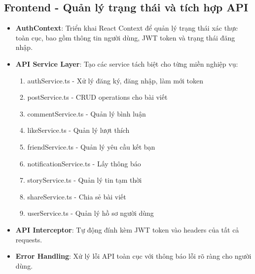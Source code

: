 \documentclass[a4paper]{article}
\begin{document}
    \subsection{Frontend - Quản lý trạng thái và tích hợp API}
    \begin{itemize}
        \item \textbf{AuthContext}: Triển khai React Context để quản lý trạng thái xác thực toàn cục, bao gồm thông tin người dùng, JWT token và trạng thái đăng nhập.
        \item \textbf{API Service Layer}: Tạo các service tách biệt cho từng miền nghiệp vụ:
        \begin{enumerate}
            \item authService.ts - Xử lý đăng ký, đăng nhập, làm mới token
            \item postService.ts - CRUD operations cho bài viết
            \item commentService.ts - Quản lý bình luận
            \item likeService.ts - Quản lý lượt thích
            \item friendService.ts - Quản lý yêu cầu kết bạn
            \item notificationService.ts - Lấy thông báo
            \item storyService.ts - Quản lý tin tạm thời
            \item shareService.ts - Chia sẻ bài viết
            \item userService.ts - Quản lý hồ sơ người dùng
        \end{enumerate}
        \item \textbf{API Interceptor}: Tự động đính kèm JWT token vào headers của tất cả requests.
        \item \textbf{Error Handling}: Xử lý lỗi API toàn cục với thông báo lỗi rõ ràng cho người dùng.
    \end{itemize}
\end{document}
